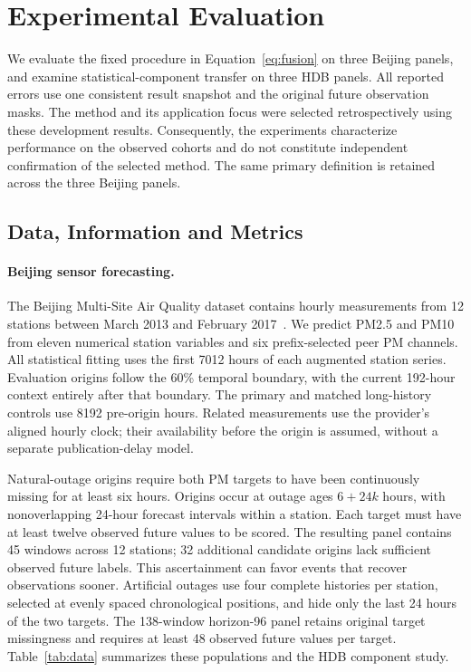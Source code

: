 \section{Experimental Evaluation}
\label{sec:experiments}

We evaluate the fixed procedure in Equation~\ref{eq:fusion} on three Beijing panels, and examine statistical-component transfer on three HDB panels. All reported errors use one consistent result snapshot and the original future observation masks. The method and its application focus were selected retrospectively using these development results. Consequently, the experiments characterize performance on the observed cohorts and do not constitute independent confirmation of the selected method. The same primary definition is retained across the three Beijing panels.

\subsection{Data, Information and Metrics}

\paragraph{Beijing sensor forecasting.}
The Beijing Multi-Site Air Quality dataset contains hourly measurements from 12 stations between March 2013 and February 2017~\citep{uci2017beijing}. We predict PM2.5 and PM10 from eleven numerical station variables and six prefix-selected peer PM channels. All statistical fitting uses the first 7012 hours of each augmented station series. Evaluation origins follow the 60\% temporal boundary, with the current 192-hour context entirely after that boundary. The primary and matched long-history controls use 8192 pre-origin hours. Related measurements use the provider's aligned hourly clock; their availability before the origin is assumed, without a separate publication-delay model.

Natural-outage origins require both PM targets to have been continuously missing for at least six hours. Origins occur at outage ages $6+24k$ hours, with nonoverlapping 24-hour forecast intervals within a station. Each target must have at least twelve observed future values to be scored. The resulting panel contains 45 windows across 12 stations; 32 additional candidate origins lack sufficient observed future labels. This ascertainment can favor events that recover observations sooner. Artificial outages use four complete histories per station, selected at evenly spaced chronological positions, and hide only the last 24 hours of the two targets. The 138-window horizon-96 panel retains original target missingness and requires at least 48 observed future values per target. Table~\ref{tab:data} summarizes these populations and the HDB component study.

